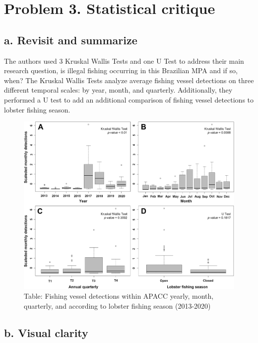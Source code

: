 \documentclass[
  letterpaper,
  DIV=11,
  numbers=noendperiod]{scrartcl}
\begin{document}
\section{Problem 3. Statistical
critique}\label{problem-3.-statistical-critique}

\subsection{a. Revisit and summarize}\label{a.-revisit-and-summarize}

The authors used 3 Kruskal Wallis Tests and one U Test to address their
main research question, is illegal fishing occurring in this Brazilian
MPA and if so, when? The Kruskal Wallis Tests analyze average fishing
vessel detections on three different temporal scales: by year, month,
and quarterly. Additionally, they performed a U test to add an
additional comparison of fishing vessel detections to lobster fishing
season.

\begin{figure}[H]

{\centering \includegraphics{images/193statcritic.jpg}

}

\caption{Table: Fishing vessel detections within APACC yearly, month,
quarterly, and according to lobster fishing season (2013-2020)}

\end{figure}%

\subsection{b. Visual clarity}\label{b.-visual-clarity}
\end{document}
